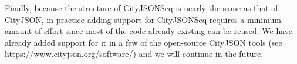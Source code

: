 \documentclass{isprs} %
\begin{document}
%

Finally, because the structure of CityJSONSeq is nearly the same as that of CityJSON, in practice adding support for CityJSONSeq requires a minimum amount of effort since most of the code already existing can be reused. 
We have already added support for it in a few of the open-source CityJSON tools (see \url{https://www.cityjson.org/software/}) and we will continue in the future.


{
	\begin{spacing}{1.17}
		\normalsize
	\end{spacing}
}
\end{document}
